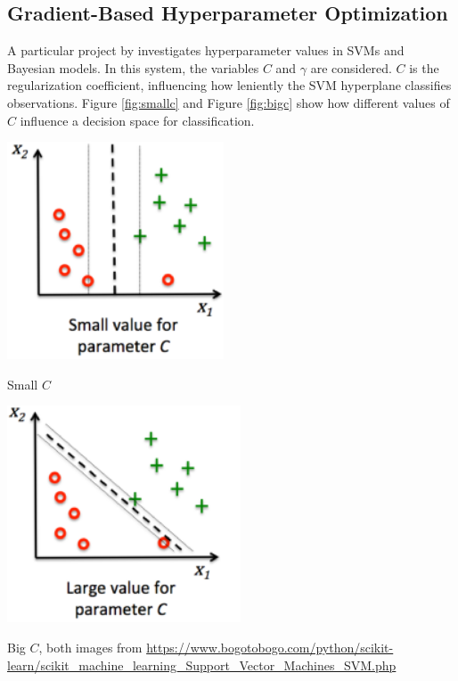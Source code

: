 \subsection{Gradient-Based Hyperparameter Optimization}
\label{sec:gradient-based-optimization}
A particular project by \cite{SathiyaKeerthi2006} investigates hyperparameter values in SVMs and Bayesian models. In this system, the variables $C$ and $\gamma$ are considered. $C$ is the regularization coefficient, influencing how leniently the SVM hyperplane classifies observations. Figure \ref{fig:smallc} and Figure \ref{fig:bigc} show how different values of $C$ influence a decision space for classification.

\begin{marginfigure}%
	\centering
	\includegraphics[width=0.8\linewidth]{graphics/hyperparameters/small_c.png}
	\caption{Small $C$}
	\label{fig:smallc}
\end{marginfigure}
\begin{marginfigure}%
	\centering
	\includegraphics[width=0.8\linewidth]{graphics/hyperparameters/big_c.png}
	\caption{Big $C$, both images from \url{https://www.bogotobogo.com/python/scikit-learn/scikit_machine_learning_Support_Vector_Machines_SVM.php}}
	\label{fig:bigc}
\end{marginfigure}

